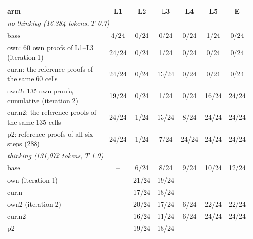 \begin{tabular}{lcccccc}
\toprule
arm & L1 & L2 & L3 & L4 & L5 & E \\
\midrule
\multicolumn{7}{l}{\emph{no thinking (16{,}384 tokens, $T$ 0.7)}} \\
base & 4/24 & 0/24 & 0/24 & 0/24 & 1/24 & 0/24 \\
own: 60 own proofs of L1--L3 (iteration 1) & 24/24 & 0/24 & 1/24 & 0/24 & 0/24 & 0/24 \\
curm: the reference proofs of the same 60 cells & 24/24 & 0/24 & 13/24 & 0/24 & 0/24 & 0/24 \\
own2: 135 own proofs, cumulative (iteration 2) & 19/24 & 0/24 & 1/24 & 0/24 & 16/24 & 24/24 \\
curm2: the reference proofs of the same 135 cells & 24/24 & 1/24 & 13/24 & 8/24 & 24/24 & 24/24 \\
p2: reference proofs of all six steps (288) & 24/24 & 1/24 & 7/24 & 24/24 & 24/24 & 24/24 \\
\midrule
\multicolumn{7}{l}{\emph{thinking (131{,}072 tokens, $T$ 1.0)}} \\
base & -- & 6/24 & 8/24 & 9/24 & 10/24 & 12/24 \\
own (iteration 1) & -- & 21/24 & 19/24 & -- & -- & -- \\
curm & -- & 17/24 & 18/24 & -- & -- & -- \\
own2 (iteration 2) & -- & 20/24 & 17/24 & 6/24 & 22/24 & 22/24 \\
curm2 & -- & 16/24 & 11/24 & 6/24 & 24/24 & 24/24 \\
p2 & -- & 19/24 & 18/24 & -- & -- & -- \\
\bottomrule
\end{tabular}
